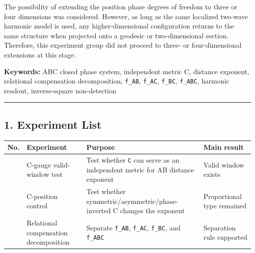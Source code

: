 \documentclass[
]{article}
\newcounter{none} %
\begin{document}
The possibility of extending the position phase degrees of freedom to
three or four dimensions was considered. However, as long as the same
localized two-wave harmonic model is used, any higher-dimensional
configuration returns to the same structure when projected onto a
geodesic or two-dimensional section. Therefore, this experiment group
did not proceed to three- or four-dimensional extensions at this stage.

\textbf{Keywords:} ABC closed phase system, independent metric C,
distance exponent, relational compensation decomposition,
\texttt{f\_AB}, \texttt{f\_AC}, \texttt{f\_BC}, \texttt{f\_ABC},
harmonic readout, inverse-square non-detection

\begin{center}\rule{0.5\linewidth}{0.5pt}\end{center}

\subsection{1. Experiment List}\label{experiment-list}

{\def\LTcaptype{none} %
\begin{longtable}[]{@{}
  >{\raggedleft\arraybackslash}p{}
  >{\raggedright\arraybackslash}p{}
  >{\raggedright\arraybackslash}p{}
  >{\raggedright\arraybackslash}p{}@{}}
\toprule\noalign{}
\begin{minipage}[b]{\linewidth}\raggedleft
No.
\end{minipage} & \begin{minipage}[b]{\linewidth}\raggedright
Experiment
\end{minipage} & \begin{minipage}[b]{\linewidth}\raggedright
Purpose
\end{minipage} & \begin{minipage}[b]{\linewidth}\raggedright
Main result
\end{minipage} \\
\midrule\noalign{}
\endhead
\bottomrule\noalign{}
\endlastfoot
1 & C-gauge valid-window test & Test whether \texttt{C} can serve as an
independent metric for AB distance exponent & Valid window exists \\
2 & C-position control & Test whether
symmetric/asymmetric/phase-inverted C changes the exponent &
Proportional type remained \\
3 & Relational compensation decomposition & Separate \texttt{f\_AB},
\texttt{f\_AC}, \texttt{f\_BC}, and \texttt{f\_ABC} & Separation rule
supported \\
\end{longtable}
}
\end{document}
